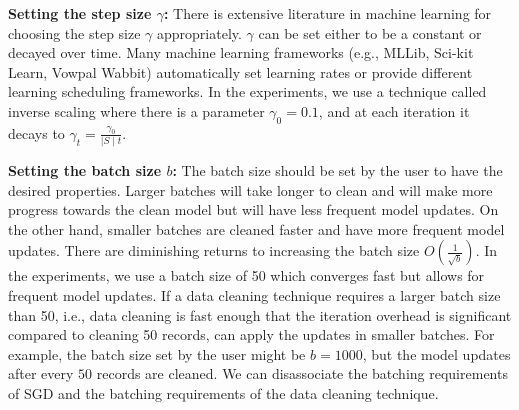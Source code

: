\vspace{0.25em}

\noindent\textbf{ Setting the step size $\gamma$: } There is extensive literature in machine learning for choosing the step size $\gamma$ appropriately. $\gamma$ can be set either to be a constant or decayed over time. Many machine learning frameworks (e.g., MLLib, Sci-kit Learn, Vowpal Wabbit) automatically set learning rates or provide different learning scheduling frameworks. 
In the experiments, we use a technique called inverse scaling where there is a parameter $\gamma_0=0.1$, and at each iteration it decays to $\gamma_t = \frac{\gamma_0}{\mid S \mid t}$. 

\vspace{0.25em}

\noindent\textbf{ Setting the batch size $b$: } The batch size should be set by the user to have the desired properties.
Larger batches will take longer to clean and will make more progress towards the clean model but will have less frequent model updates.
On the other hand, smaller batches are cleaned faster and have more frequent model updates.
There are diminishing returns to increasing the batch size $O(\frac{1}{\sqrt{b}})$.
In the experiments, we use a batch size of 50 which converges fast but allows for frequent model updates.
If a data cleaning technique requires a larger batch size than 50, i.e., data cleaning is fast enough that the iteration overhead is significant compared to cleaning 50 records, \sys can apply the updates in smaller batches.
For example, the batch size set by the user might be $b=1000$, but the model updates after every $50$ records are cleaned.
We can disassociate the batching requirements of SGD and the batching requirements of the data cleaning technique.

